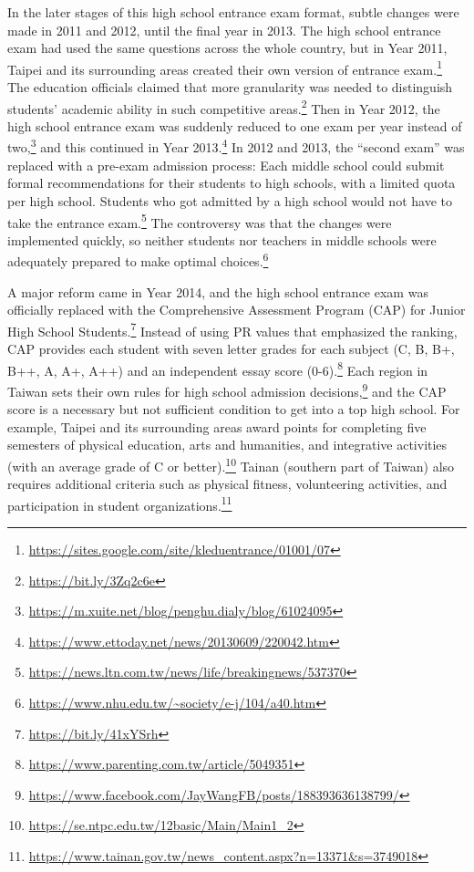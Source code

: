 \documentclass[
]{article}
\begin{document}
In the later stages of this high school entrance exam format, subtle
changes were made in 2011 and 2012, until the final year in 2013. The
high school entrance exam had used the same questions across the whole
country, but in Year 2011, Taipei and its surrounding areas created
their own version of entrance exam.\footnote{\url{https://sites.google.com/site/kleduentrance/01001/07}}
The education officials claimed that more granularity was needed to
distinguish students' academic ability in such competitive
areas.\footnote{\url{https://bit.ly/3Zq2c6e}} Then in Year 2012, the
high school entrance exam was suddenly reduced to one exam per year
instead of two,\footnote{\url{https://m.xuite.net/blog/penghu.dialy/blog/61024095}}
and this continued in Year 2013.\footnote{\url{https://www.ettoday.net/news/20130609/220042.htm}}
In 2012 and 2013, the ``second exam'' was replaced with a pre-exam
admission process: Each middle school could submit formal
recommendations for their students to high schools, with a limited quota
per high school. Students who got admitted by a high school would not
have to take the entrance exam.\footnote{\url{https://news.ltn.com.tw/news/life/breakingnews/537370}}
The controversy was that the changes were implemented quickly, so
neither students nor teachers in middle schools were adequately prepared
to make optimal choices.\footnote{\url{https://www.nhu.edu.tw/~society/e-j/104/a40.htm}}

A major reform came in Year 2014, and the high school entrance exam was
officially replaced with the Comprehensive Assessment Program (CAP) for
Junior High School Students.\footnote{\url{https://bit.ly/41xYSrh}}
Instead of using PR values that emphasized the ranking, CAP provides
each student with seven letter grades for each subject (C, B, B+, B++,
A, A+, A++) and an independent essay score (0-6).\footnote{\url{https://www.parenting.com.tw/article/5049351}}
Each region in Taiwan sets their own rules for high school admission
decisions,\footnote{\url{https://www.facebook.com/JayWangFB/posts/188393636138799/}}
and the CAP score is a necessary but not sufficient condition to get
into a top high school. For example, Taipei and its surrounding areas
award points for completing five semesters of physical education, arts
and humanities, and integrative activities (with an average grade of C
or better).\footnote{\url{https://se.ntpc.edu.tw/12basic/Main/Main1_2}}
Tainan (southern part of Taiwan) also requires additional criteria such
as physical fitness, volunteering activities, and participation in
student organizations.\footnote{\url{https://www.tainan.gov.tw/news_content.aspx?n=13371\&s=3749018}}
\end{document}
